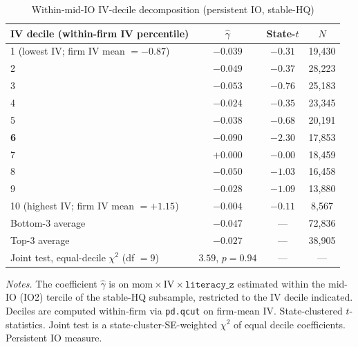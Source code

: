 \begin{table}[t]
\centering
\caption{Within-mid-IO IV-decile decomposition (persistent IO, stable-HQ)}
\label{tab:iv_within_mid_io}
\footnotesize
\begin{minipage}{\textwidth}
\centering
\begin{tabular}{lccc}
\toprule
IV decile (within-firm IV percentile) & $\hat\gamma$ & State-$t$ & $N$ \\
\midrule
1 (lowest IV; firm IV mean $= -0.87$)  & $-0.039$ & $-0.31$ & 19,430 \\
2                                       & $-0.049$ & $-0.37$ & 28,223 \\
3                                       & $-0.053$ & $-0.76$ & 25,183 \\
4                                       & $-0.024$ & $-0.35$ & 23,345 \\
5                                       & $-0.038$ & $-0.68$ & 20,191 \\
\textbf{6}                              & $\mathbf{-0.090}$ & $\mathbf{-2.30}$ & 17,853 \\
7                                       & $+0.000$ & $-0.00$ & 18,459 \\
8                                       & $-0.050$ & $-1.03$ & 16,458 \\
9                                       & $-0.028$ & $-1.09$ & 13,880 \\
10 (highest IV; firm IV mean $= +1.15$) & $-0.004$ & $-0.11$ & 8,567 \\
\midrule
Bottom-3 average  & $-0.047$ & --- & 72,836 \\
Top-3 average     & $-0.027$ & --- & 38,905 \\
Joint test, equal-decile $\chi^{2}$ (df $= 9$) & $3.59$, $p = 0.94$ & --- & --- \\
\bottomrule
\end{tabular}
\end{minipage}

\medskip
{\footnotesize\textit{Notes.} The coefficient $\hat\gamma$ is on $\mathrm{mom}\times\mathrm{IV}\times\mathtt{literacy\_z}$ estimated within the mid-IO (IO2) tercile of the stable-HQ subsample, restricted to the IV decile indicated. Deciles are computed within-firm via \texttt{pd.qcut} on firm-mean IV. State-clustered $t$-statistics. Joint test is a state-cluster-SE-weighted $\chi^{2}$ of equal decile coefficients. Persistent IO measure.}
\end{table}

